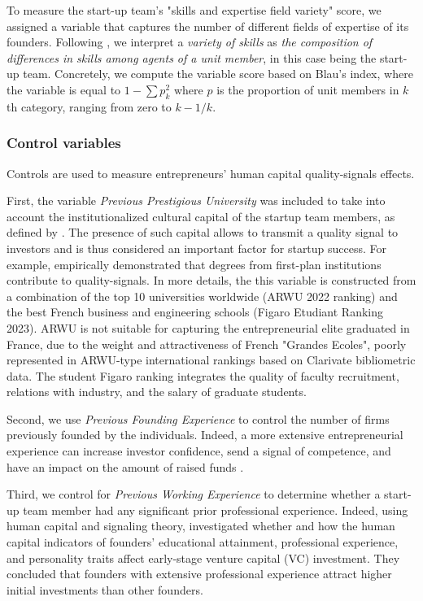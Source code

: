 \documentclass[12pt]{article}
\begin{document}
To measure the start-up team's "skills and expertise field variety" score, we assigned a variable that captures the number of different fields of expertise of its founders. Following \citet{harrison2007s}, we interpret a \textit{variety of skills} as \textit{the composition of differences in skills among agents of a unit member}, in this case being the start-up team. Concretely, we compute the variable score based on Blau's index, where the variable is equal to $1-\sum p_k^2$ where $p$ is the proportion of unit members in $k$th category, ranging from zero to $k-1/k$.

\subsubsection{Control variables}

Controls are used to measure entrepreneurs' human capital quality-signals effects.

First, the variable \textit{Previous Prestigious University} was included to take into account the institutionalized cultural capital of the startup team members, as defined by \citet{bourdieu1979distinction}. The presence of such capital allows to transmit a quality signal to investors and is thus considered an important factor for startup success. For example, \citet{ferrary1999confiance} empirically demonstrated that degrees from first-plan institutions contribute to quality-signals. In more details, the this variable is constructed from a combination of the top 10 universities worldwide (ARWU 2022 ranking) and the best French business and engineering schools (Figaro Etudiant Ranking 2023). ARWU is not suitable for capturing the entrepreneurial elite graduated in France, due to the weight and attractiveness of French "Grandes Ecoles", poorly represented in ARWU-type international rankings based on Clarivate bibliometric data. The student Figaro ranking integrates the quality of faculty recruitment, relations with industry, and the salary of graduate students.

Second, we use \textit{Previous Founding Experience} to control the number of firms previously founded by the individuals. Indeed, a more extensive entrepreneurial experience can increase investor confidence, send a signal of competence, and have an impact on the amount of raised funds \citep{hsu2007experienced}.

Third, we control for \textit{Previous Working Experience} to determine whether a start-up team member had any significant prior professional experience. Indeed, using human capital and signaling theory, \citet{subramanian2022backing} investigated whether and how the human capital indicators of founders' educational attainment, professional experience, and personality traits affect early-stage venture capital (VC) investment. They concluded that founders with extensive professional experience attract higher initial investments than other founders.
\end{document}
